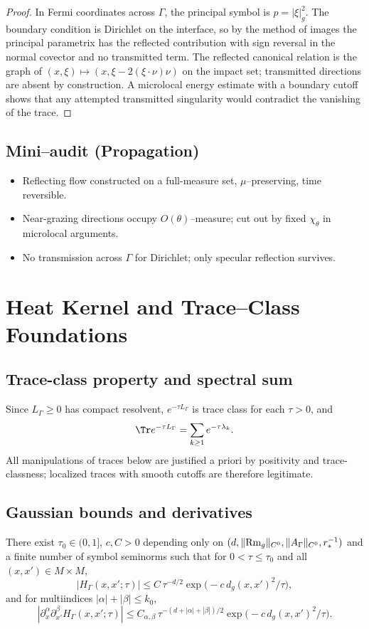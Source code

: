 \begin{proof}
In Fermi coordinates across $\Gamma$, the principal symbol is $p=|\xi|_g^2$. The boundary condition is Dirichlet on the interface, so by the method of images the principal parametrix has the reflected contribution with sign reversal in the normal covector and no transmitted term. The reflected canonical relation is the graph of $(x,\xi)\mapsto(x,\xi-2(\xi\cdot\nu)\nu)$ on the impact set; transmitted directions are absent by construction. A microlocal energy estimate with a boundary cutoff shows that any attempted transmitted singularity would contradict the vanishing of the trace.
\end{proof}

\subsection*{Mini–audit (Propagation)}
\begin{itemize}
  \item Reflecting flow constructed on a full-measure set, $\mu$–preserving, time reversible.
  \item Near-grazing directions occupy $O(\theta)$–measure; cut out by fixed $\chi_\theta$ in microlocal arguments.
  \item No transmission across $\Gamma$ for Dirichlet; only specular reflection survives.
\end{itemize}

\section{Heat Kernel and Trace–Class Foundations}
\label{sec:heat-trace-prep}

\subsection{Trace-class property and spectral sum}
Since $L_\Gamma\ge0$ has compact resolvent, $e^{-\tau L_\Gamma}$ is trace class for each $\tau>0$, and
\[
\Tr e^{-\tau L_\Gamma}=\sum_{k\ge1} e^{-\tau\lambda_k}.
\]
All manipulations of traces below are justified a priori by positivity and trace-classness; localized traces with smooth cutoffs are therefore legitimate.

\subsection{Gaussian bounds and derivatives}
\begin{proposition}
\label{prop:gaussian-bounds}
There exist $\tau_0\in(0,1]$, $c,C>0$ depending only on $(d,\|{\rm Rm}_g\|_{C^0},\|A_\Gamma\|_{C^0},r_*^{-1})$ and a finite number of symbol seminorms such that for $0<\tau\le \tau_0$ and all $(x,x')\in M\times M$,
\[
|H_\Gamma(x,x';\tau)| \le C\,\tau^{-d/2}\exp\!\big(-c\,d_g(x,x')^2/\tau\big),
\]
and for multiindices $|\alpha|+|\beta|\le k_0$,
\[
|\partial_x^\alpha \partial_{x'}^\beta H_\Gamma(x,x';\tau)|
\le C_{\alpha,\beta}\,\tau^{-(d+|\alpha|+|\beta|)/2}\exp\!\big(-c\,d_g(x,x')^2/\tau\big).
\]
\end{proposition}

